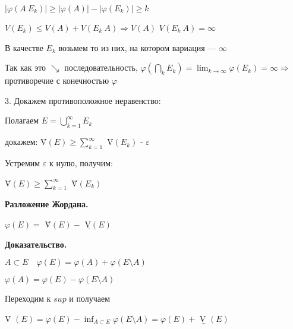 $|\varphi(A \ E_k)| \geqslant |\varphi(A)| - |\varphi(E_k)|
\geqslant k$

$V(E_k) \leqslant V(A) + V(E_k \ A) \Rightarrow V(A)$ $V(E_k \ A)
= \infty$

В качестве $E_k$ возьмем то из них, на котором вариация ---
$\infty$

Так как это $\searrow$ последовательность, $\varphi(\bigcap_k E_k)
= \lim_{k \rightarrow \infty} \varphi(E_k) = \infty \Rightarrow$
 противоречие с конечностью $\varphi$

3. \quad Докажем противоположное неравенство:

Полагаем $E = \bigcup_{k=1}^\infty E_k$

докажем: \={V}$(E) \geqslant \sum_{k=1}^\infty$ \={V}$(E_k)$ -
$\varepsilon$

Устремим $\varepsilon$ к нулю, получим:

\={V}$(E) \geqslant \sum_{k=1}^\infty$ \={V}$(E_k)$

\textbf{Разложение Жордана.}

$\varphi(E) =$ \={V}$(E) -$ \b{V}$(E)$

\textbf{Доказательство.}

$A \subset E \quad \varphi(E) = \varphi(A) + \varphi(E \setminus
A)$

$\varphi(A) = \varphi(E) - \varphi(E \setminus A)$

Переходим к $sup$ и получаем

\={V} $(E) = \varphi(E) - \inf_{A \subset E} \varphi(E \setminus
A) = \varphi(E) +$ \b{V} $(E)$
